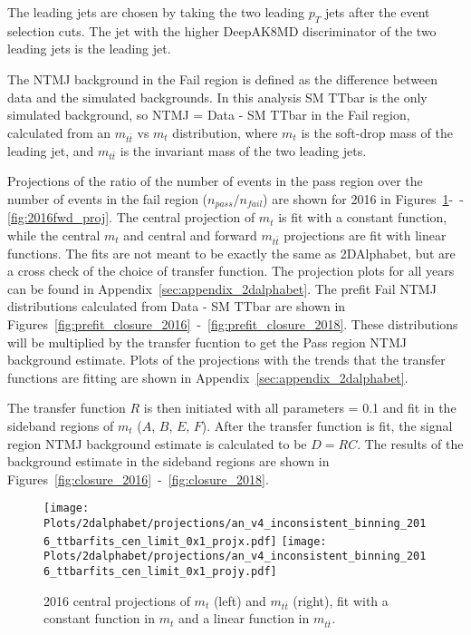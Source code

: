 The leading jets are chosen by taking the two leading $p_T$ jets after the event selection cuts. The jet with the higher DeepAK8MD discriminator of the two leading jets is the leading jet.

The NTMJ background in the Fail region is defined as the difference between data and the simulated backgrounds. In this analysis SM TTbar is the only simulated background, so NTMJ = Data - SM TTbar in the Fail region, calculated from an $m_{t \bar{t}}$ vs $m_t$ distribution, where $m_t$ is the soft-drop mass of the leading jet, and $m_{t \bar{t}}$ is the invariant mass of the two leading jets. 


Projections of the ratio of the number of events in the pass region over the number of events in the fail region ($n_{pass}/n_{fail}$) are shown for 2016 in Figures~\ref{fig:2016cen_proj}-~-\ref{fig:2016fwd_proj}. The central projection of $m_t$ is fit with a constant function, while the central $m_t$ and central and forward $m_{t\bar{t}}$ projections are fit with linear functions. The fits are not meant to be exactly the same as 2DAlphabet, but are a cross check of the choice of transfer function. The projection plots for all years can be found in Appendix~\ref{sec:appendix_2dalphabet}. The prefit Fail NTMJ distributions calculated from Data - SM TTbar are shown in Figures~\ref{fig:prefit_closure_2016}~-~\ref{fig:prefit_closure_2018}. These distributions will be multiplied by the transfer fucntion to get the Pass region NTMJ background estimate. Plots of the projections with the trends that the transfer functions are fitting are shown in Appendix~\ref{sec:appendix_2dalphabet}.


The transfer function $R$ is then initiated with all parameters = 0.1 and fit in the sideband regions of $m_t$ ($A$, $B$, $E$, $F$). After the transfer function is fit, the signal region NTMJ background estimate is calculated to be $D = R C$. The results of the background estimate in the sideband regions are shown in Figures~\ref{fig:closure_2016}~-~\ref{fig:closure_2018}.


\begin{figure}[htp]
	\begin{center}
		
		\texttt{[image: Plots/2dalphabet/projections/an\_v4\_inconsistent\_binning\_2016\_ttbarfits\_cen\_limit\_0x1\_projx.pdf]}
		\texttt{[image: Plots/2dalphabet/projections/an\_v4\_inconsistent\_binning\_2016\_ttbarfits\_cen\_limit\_0x1\_projy.pdf]}
		\caption{2016 central projections of $m_t$ (left) and $m_{t\bar{t}}$ (right), fit with a constant function in $m_t$ and a linear function in $m_{t\bar{t}}$.}
		\label{fig:2016cen_proj}
	\end{center}
\end{figure}



